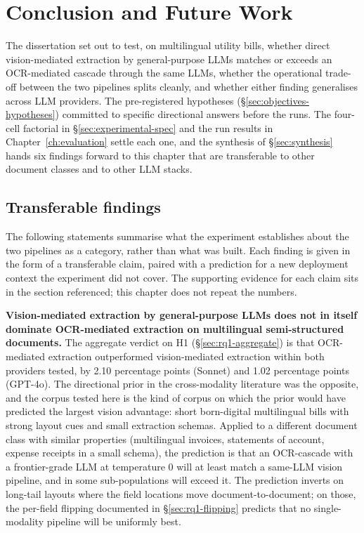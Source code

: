 \chapter{Conclusion and Future Work}
\label{ch:conclusion}

The dissertation set out to test, on multilingual utility bills, whether direct
vision-mediated extraction by general-purpose LLMs matches or exceeds an
OCR-mediated cascade through the same LLMs, whether the operational trade-off
between the two pipelines splits cleanly, and whether either finding generalises
across LLM providers. The pre-registered hypotheses
(\S\ref{sec:objectives-hypotheses}) committed to specific directional answers
before the runs. The four-cell factorial in
\S\ref{sec:experimental-spec} and the run results in
Chapter~\ref{ch:evaluation} settle each one, and the synthesis of
\S\ref{sec:synthesis} hands six findings forward to this chapter that are
transferable to other document classes and to other LLM stacks.

\section{Transferable findings}
\label{sec:findings}

The following statements summarise what the experiment establishes about the
two pipelines as a category, rather than what was built. Each finding is given
in the form of a transferable claim, paired with a prediction for a new
deployment context the experiment did not cover. The supporting evidence for
each claim sits in the section referenced; this chapter does not repeat the
numbers.

\textbf{Vision-mediated extraction by general-purpose LLMs does not in
itself dominate OCR-mediated extraction on multilingual semi-structured
documents.} The aggregate verdict on H1 (\S\ref{sec:rq1-aggregate}) is that
OCR-mediated extraction outperformed vision-mediated extraction within both
providers tested, by 2.10 percentage points (Sonnet) and 1.02 percentage
points (GPT-4o). The directional prior in the cross-modality literature was
the opposite, and the corpus tested here is the kind of corpus on which the
prior would have predicted the largest vision advantage: short born-digital
multilingual bills with strong layout cues and small extraction schemas.
Applied to a different document class with similar properties (multilingual
invoices, statements of account, expense receipts in a small schema), the
prediction is that an OCR-cascade with a frontier-grade LLM at temperature 0
will at least match a same-LLM vision pipeline, and in some sub-populations
will exceed it. The prediction inverts on long-tail layouts where the field
locations move document-to-document; on those, the per-field flipping
documented in \S\ref{sec:rq1-flipping} predicts that no single-modality
pipeline will be uniformly best.

